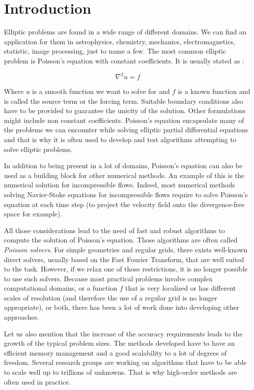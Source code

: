 \chapter*{Introduction}

Elliptic problems are found in a wide range of different domains. We can find an application for them in astrophysics, chemistry, mechanics, electromagnetics, statistic, image processing, just to name a few. The most common elliptic problem is Poisson's equation with constant coefficients. It is usually stated as :

$$\nabla^2 u = f$$

Where $u$ is a smooth function we want to solve for and $f$ is a known function and is called the source term or the forcing term. Suitable boundary conditions also have to be provided to guarantee the unicity of the solution. Other formulations might include non constant coefficients. Poisson's equation encapsulate many of the problems we can encounter while solving elliptic partial differential equations and that is why it is often used to develop and test algorithms attempting to solve elliptic problems.   

In addition to being present in a lot of domains, Poisson's equation can also be used as a building block for other numerical methods. An example of this is the numerical solution for incompressible flows. Indeed, most numerical methods solving Navier-Stoke equations for incompressible flows require to solve Poisson's equation at each time step (to project the velocity field onto the divergence-free space for example). 

All those considerations lead to the need of fast and robust algorithms to compute the solution of Poisson's equation. Those algorithms are often called \textit{Poisson solvers}. For simple geometries and regular grids, there exists well-known direct solvers, usually based on the Fast Fourier Transform, that are well suited to the task. However, if we relax one of those restrictions, it is no longer possible to use such solvers. Because most practical problems involve complex computational domains, or a function $f$ that is very localized or has different scales of resolution (and therefore the use of a regular grid is no longer appropriate), or both, there has been a lot of work done into developing other approaches. 

Let us also mention that the increase of the accuracy requirements leads to the growth of the typical problem sizes. The methods developed have to have an efficient memory management and a good scalability to a lot of degrees of freedom. Several research groups are working on algorithms that have to be able to scale well up to trillions of unknowns. That is why high-order methods are often used in practice.  

